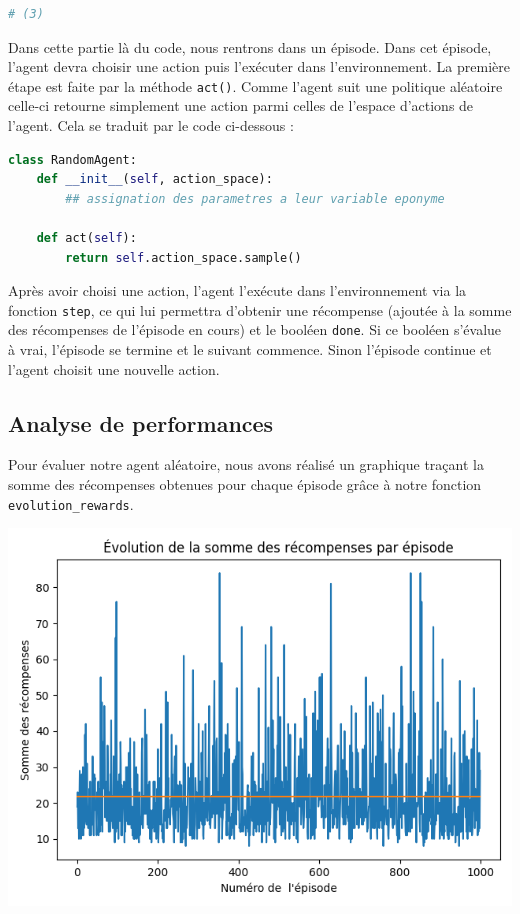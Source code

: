 \documentclass[10pt,a4paper]{article}
\begin{document}
\begin{lstlisting}[language=Python]
# (3)
\end{lstlisting}
Dans cette partie là du code, nous rentrons dans un épisode. Dans cet épisode, l'agent devra choisir une action puis l'exécuter dans l'environnement. La première étape est faite par la méthode \lstinline{act()}. Comme l'agent suit une politique aléatoire celle-ci retourne simplement une action parmi celles de l'espace d'actions de l'agent. Cela se traduit par le code ci-dessous :

\begin{lstlisting}[language=Python, caption=Implémentation de l'agent aléatoire]
class RandomAgent:
    def __init__(self, action_space):
        ## assignation des parametres a leur variable eponyme

    def act(self):
        return self.action_space.sample()
\end{lstlisting}
Après avoir choisi une action, l'agent l'exécute dans l'environnement via la fonction \lstinline{step}, ce qui lui permettra d'obtenir une récompense (ajoutée à la somme des récompenses de l'épisode en cours) et le booléen \lstinline{done}. Si ce booléen s'évalue à vrai, l'épisode se termine et le suivant commence. Sinon l'épisode continue et l'agent choisit une nouvelle action.

\subsection{Analyse de performances}


Pour évaluer notre agent aléatoire, nous avons réalisé un graphique traçant la somme des récompenses obtenues pour chaque épisode grâce à notre fonction \lstinline{evolution_rewards}.

\includegraphics[scale=0.5]{../performances/evolution_recompenses_random.png} 
\end{document}
